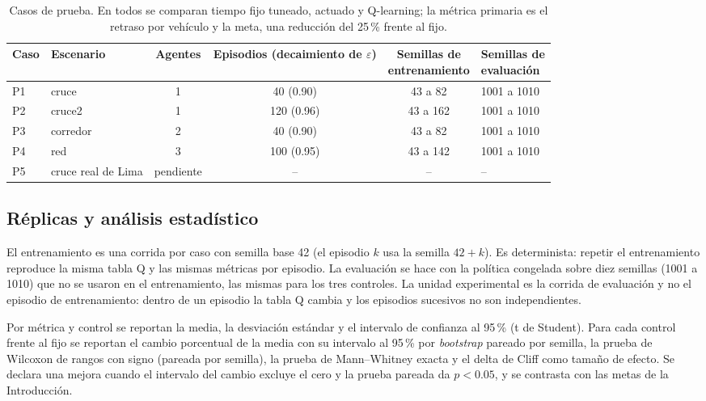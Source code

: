 \begin{table}[H]
\centering
\footnotesize
\begin{tabular}{llcccl}
\toprule
Caso & Escenario & Agentes & \makecell{Episodios\\(decaimiento de $\varepsilon$)} & \makecell{Semillas de\\entrenamiento} & \makecell{Semillas de\\evaluación} \\
\midrule
P1 & cruce    & 1 & 40 (0.90)  & 43 a 82  & 1001 a 1010 \\
P2 & cruce2   & 1 & 120 (0.96) & 43 a 162 & 1001 a 1010 \\
P3 & corredor & 2 & 40 (0.90)  & 43 a 82  & 1001 a 1010 \\
P4 & red      & 3 & 100 (0.95) & 43 a 142 & 1001 a 1010 \\
P5 & cruce real de Lima & pendiente & -- & -- & -- \\
\bottomrule
\end{tabular}
\caption{Casos de prueba. En todos se comparan tiempo fijo tuneado, actuado y Q-learning; la métrica primaria es el retraso por vehículo y la meta, una reducción del 25\,\% frente al fijo.}
\label{tab:plan}
\end{table}

\subsection*{Réplicas y análisis estadístico}

El entrenamiento es una corrida por caso con semilla base 42 (el
episodio $k$ usa la semilla $42 + k$). Es determinista: repetir el
entrenamiento reproduce la misma tabla Q y las mismas métricas por
episodio. La evaluación se hace con la política congelada sobre diez
semillas (1001 a 1010) que no se usaron en el entrenamiento, las mismas
para los tres controles. La unidad experimental es la corrida de
evaluación y no el episodio de entrenamiento: dentro de un episodio la
tabla Q cambia y los episodios sucesivos no son independientes.

Por métrica y control se reportan la media, la desviación estándar y
el intervalo de confianza al 95\,\% (t de Student). Para cada control
frente al fijo se reportan el cambio porcentual de la media con su
intervalo al 95\,\% por \textit{bootstrap} pareado por semilla, la
prueba de Wilcoxon de rangos con signo (pareada por semilla), la prueba
de Mann--Whitney exacta y el delta de Cliff como tamaño de efecto. Se
declara una mejora cuando el intervalo del cambio excluye el cero y la
prueba pareada da $p < 0.05$, y se contrasta con las metas de la
Introducción.

